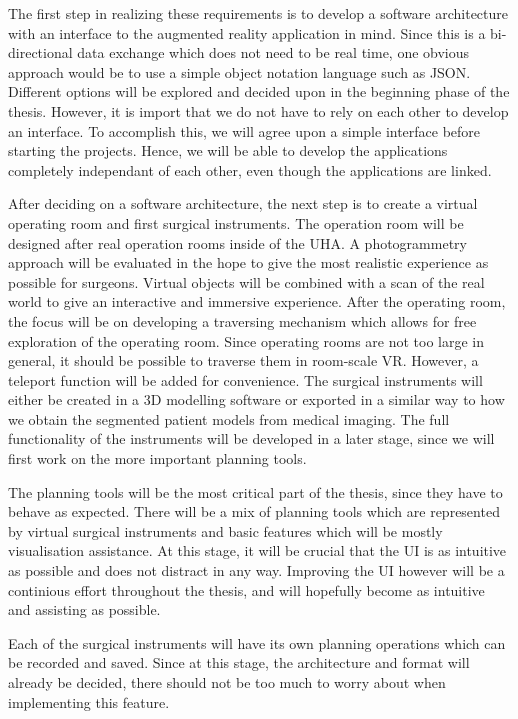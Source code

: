 The first step in realizing these requirements is to develop a software architecture with an interface to the augmented reality application in mind.
Since this is a bi-directional data exchange which does not need to be real time, one obvious approach would be to use a simple object notation language such as JSON.
Different options will be explored and decided upon in the beginning phase of the thesis.
However, it is import that we do not have to rely on each other to develop an interface.
To accomplish this, we will agree upon a simple interface before starting the projects.
Hence, we will be able to develop the applications completely independant of each other, even though the applications are linked.

After deciding on a software architecture, the next step is to create a virtual operating room and first surgical instruments.
The operation room will be designed after real operation rooms inside of the UHA.
A photogrammetry approach will be evaluated in the hope to give the most realistic experience as possible for surgeons.
Virtual objects will be combined with a scan of the real world to give an interactive and immersive experience.
After the operating room, the focus will be on developing a traversing mechanism which allows for free exploration of the operating room.
Since operating rooms are not too large in general, it should be possible to traverse them in room-scale VR.
However, a teleport function will be added for convenience.
The surgical instruments will either be created in a 3D modelling software or exported in a similar way to how we obtain the segmented patient models from medical imaging.
The full functionality of the instruments will be developed in a later stage, since we will first work on the more important planning tools.

The planning tools will be the most critical part of the thesis, since they have to behave as expected.
There will be a mix of planning tools which are represented by virtual surgical instruments and basic features which will be mostly visualisation assistance.
At this stage, it will be crucial that the UI is as intuitive as possible and does not distract in any way.
Improving the UI however will be a continious effort throughout the thesis, and will hopefully become as intuitive and assisting as possible.

Each of the surgical instruments will have its own planning operations which can be recorded and saved.
Since at this stage, the architecture and format will already be decided, there should not be too much to worry about when implementing this feature.


